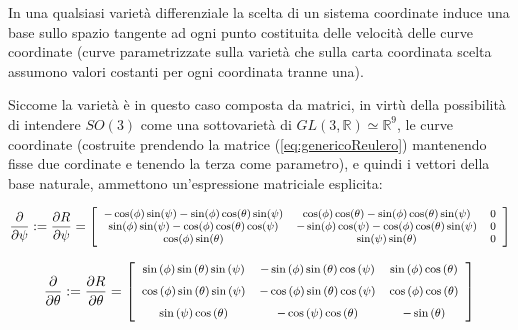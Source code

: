 \documentclass[11pt]{report}
\theoremstyle{plain}
\theoremstyle{definition}
\theoremstyle{remark}
\begin{document}
In una qualsiasi varietà differenziale la scelta di un sistema coordinate induce una base sullo spazio tangente ad ogni punto costituita delle velocità delle curve coordinate (curve parametrizzate sulla varietà che sulla carta coordinata scelta assumono valori costanti per ogni coordinata tranne una).

Siccome la varietà è in questo caso composta da matrici, in virtù della possibilità di intendere $SO(3)$ come una sottovarietà di $GL(3,\mathbb{R}) \simeq \mathbb{R}^{9}$, le curve coordinate (costruite prendendo la matrice (\ref{eq:genericoReulero}) mantenendo fisse due cordinate e tenendo la terza come parametro), e quindi i vettori della base naturale, ammettono un'espressione matriciale esplicita:
\begin{flushleft}

\begin{displaymath}\footnotesize
\dfrac{\partial}{\partial \psi} := \dfrac{\partial R}{\partial \psi} = \left[ \begin{array}{ccc}
-\cos(\phi) \sin(\psi) - \sin(\phi) \cos(\theta) \sin(\psi) & \cos(\phi)\cos(\theta) -\sin(\phi)\cos(\theta)\sin(\psi) & 0  \\
\sin(\phi) \sin(\psi) - \cos(\phi) \cos(\theta) \cos(\psi) & - \sin(\phi)\cos(\psi) -\cos(\phi)\cos(\theta)\sin(\psi) & 0  \\
\cos(\phi)\sin(\theta) & \sin(\psi)\sin(\theta) & 0 \\
\end{array} \right]
\end{displaymath}

\begin{displaymath}\footnotesize
\dfrac{\partial}{\partial \theta} := \dfrac{\partial R}{\partial \theta} = \left[ \begin {array}{ccc} \sin \left( \phi \right) \sin \left( \theta \right) \sin \left( \psi \right) &-\sin \left( \phi \right) \sin \left( \theta \right) \cos \left( \psi \right) &\sin \left( \phi \right) \cos \left( \theta \right) \\ \noalign{\medskip}\cos \left( \phi \right) \sin \left( \theta \right) \sin \left( \psi \right) &-\cos \left( \phi \right) \sin \left( \theta \right) \cos \left( \psi \right) &\cos \left( \phi \right) \cos \left( \theta \right) \\ \noalign{\medskip}\sin \left( \psi \right) \cos \left( \theta \right) &-\cos \left( \psi \right) \cos \left( \theta \right) &-\sin \left( \theta \right) \end {array} \right]
\end{displaymath}


\end{flushleft}
\end{document}
